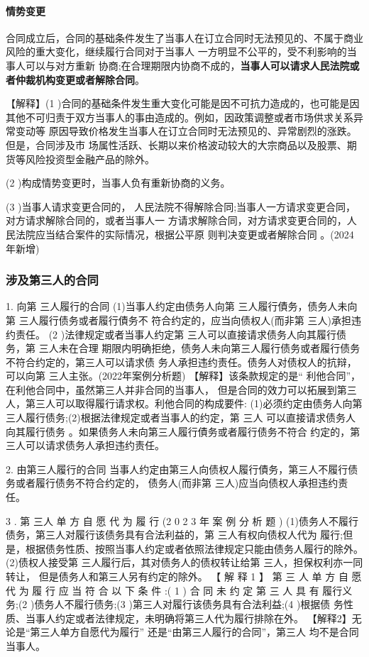 \documentclass[UTF8,12pt]{ctexart}
\numberwithin{equation}{section} %
\numberwithin{figure}{section}
\numberwithin{table}{section}
\begin{document}
	\paragraph{情势变更} 合同成立后，合同的基础条件发生了当事人在订立合同时无法预见的、不属于商业风险的重大变化，继续履行合同对于当事人 一方明显不公平的，受不利影响的当事人可以与对方重新 协商;在合理期限内协商不成的，\textbf{当事人可以请求人民法院或者仲裁机构变更或者解除合同}。
	
	【解释】(1 )合同的基础条件发生重大变化可能是因不可抗力造成的，也可能是因其他不可归责于双方当事人的事由造成的。例如，因政策调整或者市场供求关系异常变动等 原因导致价格发生当事人在订立合同时无法预见的、异常剧烈的涨跌。但是，合同涉及市 场属性活跃、长期以来价格波动较大的大宗商品以及股票、期货等风险投资型金融产品的除外。
	
	(2 )构成情势变更时，当事人负有重新协商的义务。
	
	(3 )当事人请求变更合同的， 人民法院不得解除合同;当事人一方请求变更合同，对方请求解除合同的，或者当事人一 方请求解除合同，对方请求变更合同的，人民法院应当结合案件的实际情况，根据公平原 则判决变更或者解除合同 。(2024年新增)
	
	
	
	\subsubsection{涉及第三人的合同}
	1. 向第 三人履行的合同
	(1)当事人约定由债务人向第 三人履行債务，债务人未向第 三人履行债务或者履行債务不 符合约定的，应当向债权人(而非第 三人)承担违约责任。
	(2 )法律规定或者当事人约定第 三人可以直接请求债务人向其履行债务，第 三人未在合理 期限内明确拒绝，债务人未向第三人履行债务或者履行债务不符合约定的，第三人可以请求债 务人承担违约责任。债务人对债权人的抗辩，可以向第 三人主张。(2022年案例分析题)
	【解释】该条款规定的是“ 利他合同”，在利他合同中，虽然第三人并非合同的当事人， 但是合同的效力可以拓展到第三人，第三人可以取得履行请求权。利他合同的构成要件: (1)必须约定由债务人向第三人履行债务;(2)根据法律规定或者当事人的约定，第 三人 可以直接请求债务人向其履行债务 。如果债务人未向第三人履行債务或者履行债务不符合 约定的，第三人可以请求债务人承担违约责任。
	
	2. 由第三人履行的合同 当事人约定由第三人向债权人履行債务，第三人不履行债务或者履行债务不符合约定的， 债务人(而非第 三人)应当向债权人承担违约责任。
	
	3 . 第 三人 单 方 自 愿 代 为 履 行 (2 0 2 3 年 案 例 分 析 题 ) (1)债务人不履行债务，第三人对履行该债务具有合法利益的，第 三人有权向债权人代为 履行;但是，根据债务性质、按照当事人约定或者依照法律规定只能由债务人履行的除外。 (2)债权人接受第 三人履行后，其对债务人的债权转让给第 三人，担保权利亦一同转让， 但是债务人和第三人另有约定的除外。
	【 解 释 1 】 第 三 人 单 方 自 愿 代 为 履 行 应 当 符 合 以 下 条 件 :( 1 ) 合 同 未 约 定 第 三 人 具 有 履行义务;(2 )债务人不履行债务;(3 )第三人对履行该债务具有合法利益;(4 )根据债 务性质、当事人约定或者法律规定，未明确将第三人代为履行排除在外。 
	【解释2】无论是“第三人单方自愿代为履行” 还是“由第三人履行的合同”，第三人 均不是合同当事人。
\end{document}
